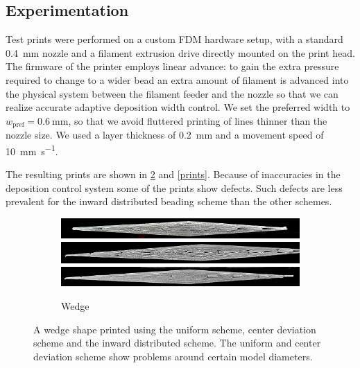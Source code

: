 \subsection{Experimentation}
Test prints were performed on a custom FDM hardware setup, with a standard \SI{0.4}{\milli\meter} nozzle and a filament extrusion drive directly mounted on the print head.
The firmware of the printer employs linear advance: to gain the extra pressure required to change to a wider bead an extra amount of filament is advanced into the physical system between the filament feeder and the nozzle so that we can realize accurate adaptive deposition width control.\cite{tronvoll2019investigating}
We set the preferred width to $w_\text{pref} = \SI{0.6}{\milli\meter}$, so that we avoid fluttered printing of lines thinner than the nozzle size.
We used a layer thickness of \SI{0.2}{\milli\meter} and a movement speed of \SI{10}{\milli\meter\per\second}.

The resulting prints are shown in \cref{wedge_print} and \cref{prints}.
Because of inaccuracies in the deposition control system some of the prints show defects.
Such defects are less prevalent for the inward distributed beading scheme than the other schemes.


\begin{figure}
\centering
\begin{subfigure}{\columnwidth}\centering
\setlength{\figwidth}{\columnwidth}
\includegraphics[width=\figwidth]{sources/applications/P3_print_wedge_naive_edited.png}
\includegraphics[width=\figwidth]{sources/applications/P3_print_wedge_center_edited.png}
\includegraphics[width=\figwidth]{sources/applications/P3_print_wedge_inward_edited.png}
\caption{Wedge}\label{print_wedge}
\end{subfigure}
\caption{
A wedge shape printed using the uniform scheme, center deviation scheme and the inward distributed scheme.
The uniform and center deviation scheme show problems around certain model diameters.
}
\label{wedge_print}
\end{figure}

